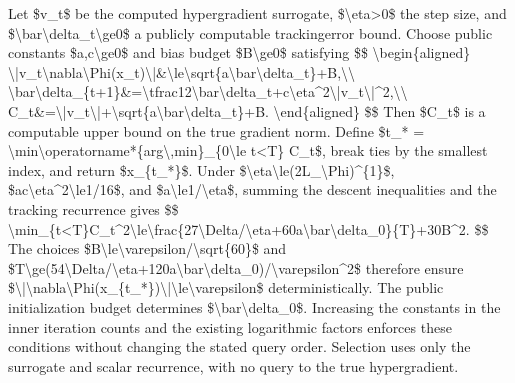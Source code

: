 \documentclass[10pt,a4paper]{article}
\begin{document}
Let \$v\_t\$ be the computed hypergradient surrogate, \$\textbackslash{}eta>0\$ the step size, and \$\textbackslash{}bar\textbackslash{}delta\_t\textbackslash{}ge0\$ a publicly computable trackingerror bound. Choose public constants \$a,c\textbackslash{}ge0\$ and bias budget \$B\textbackslash{}ge0\$ satisfying
\$\$
\textbackslash{}begin\{aligned\}
\textbackslash{}|v\_t\textbackslash{}nabla\textbackslash{}Phi(x\_t)\textbackslash{}|\&\allowbreak{}\textbackslash{}le\textbackslash{}sqrt\{a\textbackslash{}bar\textbackslash{}delta\_t\}+\allowbreak{}B,\textbackslash{}\textbackslash{}
\textbackslash{}bar\textbackslash{}delta\_\{t+1\}\&=\textbackslash{}tfrac\allowbreak{}12\textbackslash{}bar\textbackslash{}delta\_t+c\textbackslash{}eta\textasciicircum{}2\textbackslash{}|\allowbreak{}v\_t\textbackslash{}|\textasciicircum{}2,\textbackslash{}\textbackslash{}
C\_t\&=\textbackslash{}|v\_t\textbackslash{}|+\textbackslash{}sqrt\{a\textbackslash{}bar\textbackslash{}delta\_t\}+B.
\textbackslash{}end\{aligned\}
\$\$
Then \$C\_t\$ is a computable upper bound on the true gradient norm. Define \$t\_* = \textbackslash{}min\textbackslash{}operatorname*\{arg\textbackslash{},min\}\_\{0\textbackslash{}le t<T\} C\_t\$, break ties by the smallest index, and return \$x\_\{t\_*\}\$. Under \$\textbackslash{}eta\textbackslash{}le(2L\_\textbackslash{}Phi)\textasciicircum{}\{1\}\$, \$ac\textbackslash{}eta\textasciicircum{}2\textbackslash{}le1/16\$, and \$a\textbackslash{}le1/\textbackslash{}eta\$, summing the descent inequalities and the tracking recurrence gives
\$\$
\textbackslash{}min\_\{t<T\}C\_t\textasciicircum{}2\textbackslash{}le\textbackslash{}frac\{\allowbreak{}27\textbackslash{}Delta/\textbackslash{}eta+60a\textbackslash{}bar\textbackslash{}de\allowbreak{}lta\_0\}\{T\}+30B\textasciicircum{}2.
\$\$
The choices \$B\textbackslash{}le\textbackslash{}varepsilon/\textbackslash{}sqrt\{60\}\$ and \$T\textbackslash{}ge(54\textbackslash{}Delta/\textbackslash{}eta+120a\allowbreak{}\textbackslash{}bar\textbackslash{}delta\_0)/\textbackslash{}varepsilo\allowbreak{}n\textasciicircum{}2\$ therefore ensure \$\textbackslash{}|\textbackslash{}nabla\textbackslash{}Phi(x\_\{t\_*\})\textbackslash{}|\textbackslash{}le\textbackslash{}varepsilon\$ deterministically. The public initialization budget determines \$\textbackslash{}bar\textbackslash{}delta\_0\$. Increasing the constants in the inner iteration counts and the existing logarithmic factors enforces these conditions without changing the stated query order. Selection uses only the surrogate and scalar recurrence, with no query to the true hypergradient.
\end{document}
